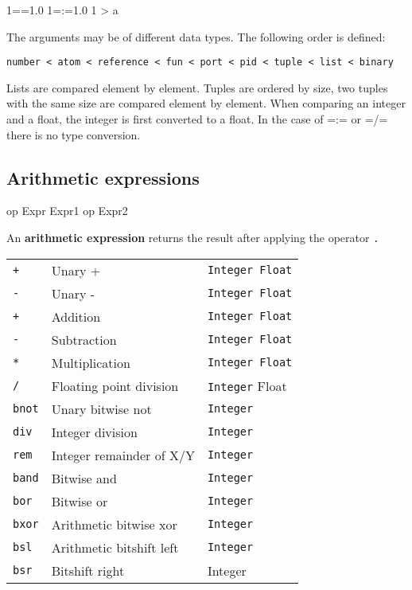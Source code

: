 \begin{erlang}
1==1.0              %
1=:=1.0             %
1 > a               %
\end{erlang}

The arguments may be of different data types. The following order is
defined:

\texttt{number < atom < reference < fun < port < pid < tuple < list < binary}

Lists are compared element by element. Tuples are ordered by size, two
tuples with the same size are compared element by element. When
comparing an integer and a float, the integer is first converted to a
float. In the case of =:= or =/= there is no type conversion.


\subsection{Arithmetic expressions}

\begin{erlang}
op Expr
Expr1 op Expr2
\end{erlang}

An \textbf{arithmetic expression} returns the result after applying
the operator \texttt{.}

\begin{center}
\begin{tabular}{|>{\raggedright}p{35pt}|>{\raggedright}p{145pt}|>{\raggedright}p{128pt}|}
\hline
\multicolumn{3}{|p{309pt}|}{Arithmetic operators}\tabularnewline
\hline
\texttt{+}  & Unary +  & \texttt{Integer \textbar{} Float} \tabularnewline
\hline
\texttt{-}  & Unary -  & \texttt{Integer \textbar{} Float}\tabularnewline
\hline
\texttt{+}  & Addition & \texttt{Integer \textbar{} Float}\tabularnewline
\hline
\texttt{-}  & Subtraction & \texttt{Integer \textbar{} Float}\tabularnewline
\hline
\texttt{*}  & Multiplication & \texttt{Integer \textbar{} Float}\tabularnewline
\hline
\texttt{/}  & Floating point division  & \texttt{Integer} \textbar{} Float\tabularnewline
\hline
\texttt{bnot}  & Unary bitwise not  & \texttt{Integer} \tabularnewline
\hline
\texttt{div}  & Integer division  & \texttt{Integer}\tabularnewline
\hline
\texttt{rem}  & Integer remainder of X/Y  & \texttt{Integer} \tabularnewline
\hline
\texttt{band}  & Bitwise and  & \texttt{Integer}\tabularnewline
\hline
\texttt{bor}  & Bitwise or  & \texttt{Integer} \tabularnewline
\hline
\texttt{bxor}  & Arithmetic bitwise xor  & \texttt{Integer}\tabularnewline
\hline
\texttt{bsl}  & Arithmetic bitshift left  & \texttt{Integer} \tabularnewline
\hline
\texttt{bsr}  & Bitshift right  & Integer\tabularnewline
\hline
\end{tabular}
\end{center}

